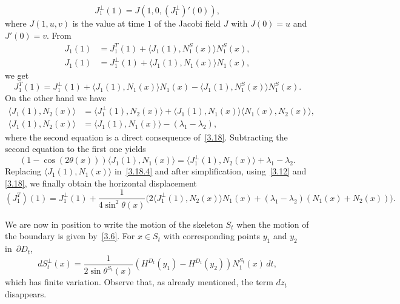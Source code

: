 \documentclass[10pt]{amsart}
\theoremstyle{plain}
\theoremstyle{definition}
\let\f\frac
\let\l\lambda
\begin{document}
\begin{equation}
J_1^\perp(1)=J\left(1,0,(J_1^\perp)'(0)\right),
\end{equation}
where $J(1,u,v)$ is the value at time $1$ of the Jacobi field $J$ with $J(0)=u$ and $J'(0)=v$.
From
\begin{equation}
\begin{split}
J_1(1)&=J_1^T(1)+\langle J_1(1),N_1^S(x)\rangle N_1^S(x),\\
J_1(1)&=J_1^\perp(1)+\langle J_1(1),N_1(x)\rangle N_1(x),
\end{split}
\end{equation}
we get
\begin{equation}
\label{3.18.4}
J_1^T(1)=J_1^\perp (1)+\langle J_1(1),N_1(x)\rangle N_1(x)-\langle J_1(1),N_1^S(x)\rangle N_1^S(x).
\end{equation}
On the other hand we have
\begin{equation}
\begin{split}
\langle J_1(1),N_2(x)\rangle &=\langle J_1^\perp(1),N_2(x)\rangle +\langle J_1(1),N_1(x)\rangle\langle N_1(x),N_2(x)\rangle,\\
\langle J_1(1),N_2(x)\rangle &=\langle J_1(1),N_1(x)\rangle -(\l_1-\l_2),
\end{split}
\end{equation}
where the second equation is a direct consequence of~\eqref{3.18}.
Subtracting the second equation to the first one yields
\begin{equation}
(1-\cos(2\theta(x)))\langle J_1(1),N_1(x)\rangle=\langle J_1^\perp(1),N_2(x)\rangle+\l_1-\l_2.
\end{equation}
Replacing $\langle J_1(1),N_1(x)\rangle$ in~\eqref{3.18.4} and after simplification, using~\eqref{3.12} {and \eqref{3.18},} we finally obtain the horizontal displacement
\[
(J_1^T)(1)=J_1^\perp(1)+\f1{4\sin^2\theta(x)}\bigl({2}\langle J_1^\perp(1),N_2(x)\rangle {N_1(x)}
+(\l_1-\l_2)(N_1(x)+N_2(x))\bigr).
\]

We are now in position to write the motion of the skeleton $S_t$ when the motion of the boundary is given by~\eqref{3.6}. For $x\in S_t$ with corresponding points $y_1$ and $y_2$ in~$\partial D_t$,
\begin{equation}\label{3.10}
dS_t^\perp (x)=\f{1}{2\sin\theta^{S_t}(x)}\left(H^{D_t}(y_1)-H^{D_t}(y_2)\right)N_1^{S_t}(x)\, dt,
\end{equation}
which has finite variation. Observe that, as already mentioned, the term $dz_t$ disappears.
\end{document}
